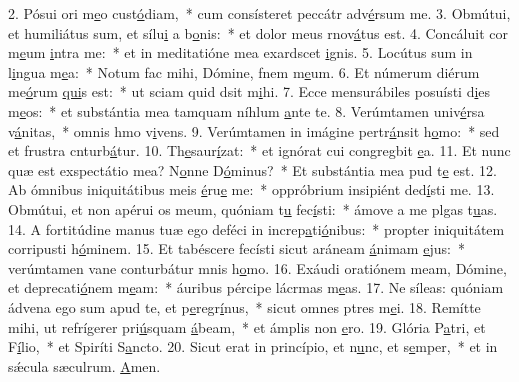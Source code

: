 2. Pósui ori m\uline{e}o cust\uline{ó}diam,~* cum consísteret peccátr adv\uline{é}rsum me.
3. Obmútui, et humiliátus sum, et sílu\uline{i} a b\uline{o}nis:~* et dolor meus rnov\uline{á}tus est.
4. Concáluit cor m\uline{e}um \uline{i}ntra me:~* et in meditatióne mea exardscet \uline{i}gnis.
5. Locútus sum in l\uline{i}ngua m\uline{e}a:~* Notum fac mihi, Dómine, fnem m\uline{e}um.
6. Et númerum diérum me\uline{ó}rum \uline{qui}s est:~* ut sciam quid dsit m\uline{i}hi.
7. Ecce mensurábiles posuísti d\uline{i}es m\uline{e}os:~* et substántia mea tamquam níhlum \uline{a}nte te.
8. Verúmtamen univ\uline{é}rsa v\uline{á}nitas,~* omnis hmo v\uline{i}vens.
9. Verúmtamen in imágine pertr\uline{á}nsit h\uline{o}mo:~* sed et frustra cnturb\uline{á}tur.
10. Th\uline{e}saur\uline{í}zat:~* et ignórat cui congregbit \uline{e}a.
11. Et nunc quæ est exspectátio mea? N\uline{o}nne D\uline{ó}minus?~* Et substántia mea pud t\uline{e} est.
12. Ab ómnibus iniquitátibus meis \uline{é}ru\uline{e} me:~* oppróbrium insipiént ded\uline{í}sti me.
13. Obmútui, et non apérui os meum, quóniam t\uline{u} fec\uline{í}sti:~* ámove a me plgas t\uline{u}as.
14. A fortitúdine manus tuæ ego deféci in increp\uline{a}ti\uline{ó}nibus:~* propter iniquitátem corripusti h\uline{ó}minem.
15. Et tabéscere fecísti sicut aráneam \uline{á}nimam \uline{e}jus:~* verúmtamen vane conturbátur mnis h\uline{o}mo.
16. Exáudi oratiónem meam, Dómine, et deprecati\uline{ó}nem m\uline{e}am:~* áuribus pércipe lácrmas m\uline{e}as.
17. Ne síleas: quóniam ádvena ego sum apud te, et p\uline{e}regr\uline{í}nus,~* sicut omnes ptres m\uline{e}i.
18. Remítte mihi, ut refrígerer pri\uline{ú}squam \uline{á}beam,~* et ámplis non \uline{e}ro.
19. Glória P\uline{a}tri, et F\uline{í}lio,~* et Spiríti S\uline{a}ncto.
20. Sicut erat in princípio, et n\uline{u}nc, et s\uline{e}mper,~* et in sǽcula sæculrum. \uline{A}men.
